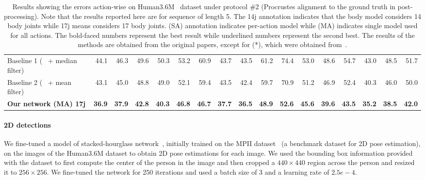 \documentclass[runningheads]{llncs}
\begin{document}
\begin{table*}
{\begin{tabular}{@{}lrrrrrrrrrrrrrrrr@{}}
\hline
Baseline 1 (~\cite{JMartinez:ICCV:2017} + median filter)  & 44.1& 	46.3& 	49.6& 	50.3& 	53.2& 	60.9& 	43.7& 	43.5& 	61.2& 	74.4& 	53.0& 	48.6& 	54.7& 	43.0& 	48.5& 	51.7\\
Baseline 2 (~\cite{JMartinez:ICCV:2017} + mean filter)  & 43.1 &  45.0& 48.8 &	49.0& 52.1 &	59.4&	43.5&	42.4&	59.7&	70.9& 51.2 & 46.9 &	52.4& 40.3 &	46.0& 50.0 \\ 
\textbf{Our network (MA) 17j} & \bf{36.9}&  \bf{37.9}&	\bf{42.8}&	\bf{40.3}&	\bf{46.8}&	\bf{46.7}&	\bf{37.7}&	\bf{36.5}&	\bf{48.9}&	\bf{52.6}&	\bf{45.6}&	\bf{39.6}&	\bf{43.5}&	\bf{35.2}&	\bf{38.5}&	\bf{42.0}\\
\hline
\end{tabular}
}
\vspace{3mm}
\caption{Results showing the errors action-wise on Human3.6M~\cite{h36m_pami} dataset under protocol \#2 (Procrustes alignment to the ground truth in post-processing). Note that the results reported here are for sequence of length 5. The 14j  annotation indicates that the body model considers 14  body joints while 17j means considers 17 body joints. (SA) annotation indicates per-action model while (MA) indicates single model used for all actions. The bold-faced numbers represent the best result while underlined numbers represent the second best. The results of the methods are obtained from the original
papers, except for (*), which were obtained from~\cite{bogo2016keep}.}
\vspace{-5mm}
\label{tab:protocol_2}
\end{table*}


\paragraph{2D detections} 
We fine-tuned a model of stacked-hourglass network~\cite{stacked-hourglass}, initially trained on the MPII dataset~\cite{mpii} (a benchmark dataset for 2D pose estimation), on the images of the Human3.6M dataset to obtain 2D pose estimations for each image. We used the bounding box information provided with the dataset to first compute the center of the person in the image and then cropped a $440 \times 440$ region across the person and resized it to $256 \times 256$. We fine-tuned the network for 250 iterations and used a batch size of 3 and a learning rate of $2.5e-4$.
\end{document}
